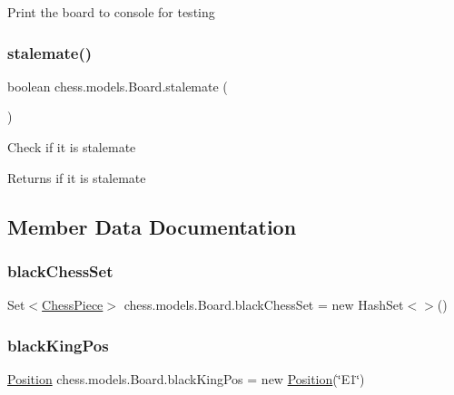 Print the board to console for testing \mbox{\label{classchess_1_1models_1_1_board_aca772c3b56248d6e3fbf97d00a9abaf9}} 
\subsubsection{\texorpdfstring{stalemate()}{stalemate()}}
{\footnotesize\ttfamily boolean chess.\+models.\+Board.\+stalemate (\begin{DoxyParamCaption}{ }\end{DoxyParamCaption})}

Check if it is stalemate

\begin{DoxyReturn}{Returns}
if it is stalemate 
\end{DoxyReturn}


\subsection{Member Data Documentation}
\mbox{\label{classchess_1_1models_1_1_board_ac9ce24be7c95629a0fce07798e2de02e}} 
\subsubsection{\texorpdfstring{black\+Chess\+Set}{blackChessSet}}
{\footnotesize\ttfamily Set$<$\mbox{\hyperlink{classchess_1_1models_1_1_chess_piece}{Chess\+Piece}}$>$ chess.\+models.\+Board.\+black\+Chess\+Set = new Hash\+Set$<$$>$()\hspace{0.3cm}{\ttfamily [private]}}

\mbox{\label{classchess_1_1models_1_1_board_a052908fb3da796dbd328159704d96be7}} 
\subsubsection{\texorpdfstring{black\+King\+Pos}{blackKingPos}}
{\footnotesize\ttfamily \mbox{\hyperlink{classchess_1_1models_1_1_position}{Position}} chess.\+models.\+Board.\+black\+King\+Pos = new \mbox{\hyperlink{classchess_1_1models_1_1_position}{Position}}(\char`\"{}E1\char`\"{})\hspace{0.3cm}{\ttfamily [private]}}

